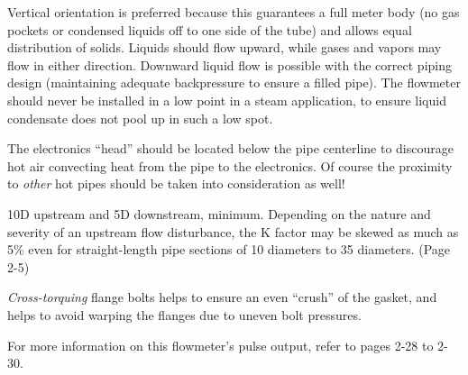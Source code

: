 












Vertical orientation is preferred because this guarantees a full meter body (no gas pockets or condensed liquids off to one side of the tube) and allows equal distribution of solids.  Liquids should flow upward, while gases and vapors may flow in either direction.  Downward liquid flow is possible with the correct piping design (maintaining adequate backpressure to ensure a filled pipe).  The flowmeter should never be installed in a low point in a steam application, to ensure liquid condensate does not pool up in such a low spot.

\vskip 10pt

The electronics ``head'' should be located below the pipe centerline to discourage hot air convecting heat from the pipe to the electronics.  Of course the proximity to {\it other} hot pipes should be taken into consideration as well!

\vskip 10pt

10D upstream and 5D downstream, minimum.  Depending on the nature and severity of an upstream flow disturbance, the K factor may be skewed as much as 5\% even for straight-length pipe sections of 10 diameters to 35 diameters.  (Page 2-5)

\vskip 10pt

{\it Cross-torquing} flange bolts helps to ensure an even ``crush'' of the gasket, and helps to avoid warping the flanges due to uneven bolt pressures.

\vskip 10pt

For more information on this flowmeter's pulse output, refer to pages 2-28 to 2-30.




